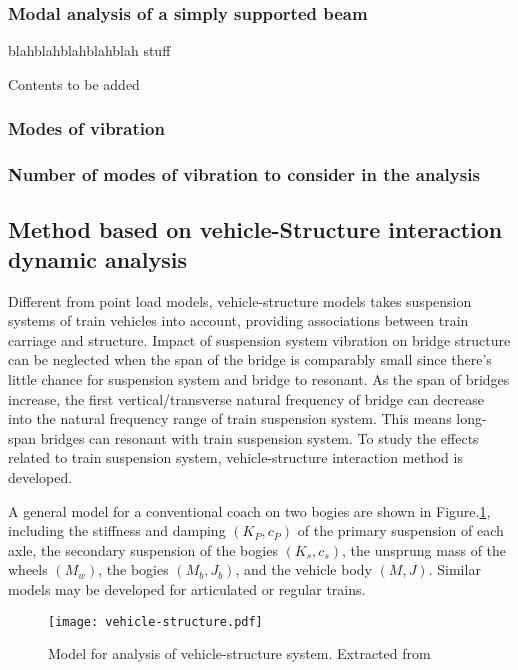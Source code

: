 \subsubsection{Modal analysis of a simply supported beam}
blahblahblahblahblah stuff

\blindtext

Contents to be added

\subsubsection{Modes of vibration}

\blindtext

\subsubsection{Number of modes of vibration to consider in the analysis}

\blindtext


\subsection{Method based on vehicle-Structure interaction dynamic analysis}\label{sec:tds}
Different from point load models, vehicle-structure models takes suspension systems of train vehicles into account, providing associations between train carriage and structure. Impact of suspension system vibration on bridge structure can be neglected when the span of the bridge is comparably small since there's little chance for suspension system and bridge to resonant. As the span of bridges increase, the first vertical/transverse natural frequency of bridge can decrease into the natural frequency range of train suspension system. This means long-span bridges can resonant with train suspension system. To study the effects related to train suspension system, vehicle-structure interaction method is developed. 

A general model for a conventional coach on two bogies are shown in Figure.\ref{fig:vehicle-structure}, including the stiffness and damping $(K_P,c_P)$ of the primary suspension of each axle, the secondary suspension of the bogies $(K_s,c_s)$, the unsprung mass of the wheels $(M_w)$, the bogies $(M_b, J_b)$, and the vehicle body $(M,J)$. Similar models may be developed for articulated or regular trains.

\begin{figure}[h]
	\centering
	\texttt{[image: vehicle-structure.pdf]}
	\caption{Model for analysis of vehicle-structure system. Extracted from \cite[Figure 12]{lei2002analyses}}
	\label{fig:vehicle-structure}
\end{figure}

